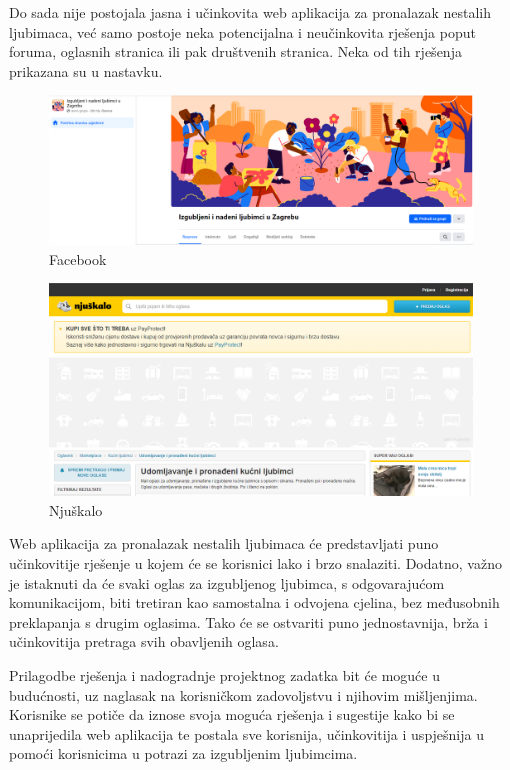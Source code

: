 Do sada nije postojala jasna i učinkovita web aplikacija za pronalazak nestalih ljubimaca, već samo postoje neka potencijalna i neučinkovita rješenja poput foruma, oglasnih stranica ili pak društvenih stranica. Neka od tih rješenja prikazana su u nastavku.

\begin{figure}[H]
	\centering
	\includegraphics[scale=0.3]{slike/Facebook-nestaliLjubimci.PNG}
	\caption{Facebook}
	\label{fig:promjene}
\end{figure}

\begin{figure}[H]
	\centering
	\includegraphics[scale=0.3]{slike/Njuskalo-nestaliLjubimci.PNG}
	\caption{Njuškalo}
	\label{fig:promjene}
\end{figure}

Web aplikacija za pronalazak nestalih ljubimaca će predstavljati puno učinkovitije rješenje u kojem će se korisnici lako i brzo snalaziti. Dodatno, važno je istaknuti da će svaki oglas za izgubljenog ljubimca, s odgovarajućom komunikacijom, biti tretiran kao samostalna i odvojena cjelina, bez međusobnih preklapanja s drugim oglasima. Tako će se ostvariti puno jednostavnija, brža i učinkovitija pretraga svih obavljenih oglasa.

Prilagodbe rješenja i nadogradnje projektnog zadatka bit će moguće u budućnosti, uz naglasak na korisničkom zadovoljstvu i njihovim mišljenjima. Korisnike se potiče da iznose svoja moguća rješenja i sugestije kako bi se unaprijedila web aplikacija te postala sve korisnija, učinkovitija i uspješnija u pomoći korisnicima u potrazi za izgubljenim ljubimcima.

\eject


